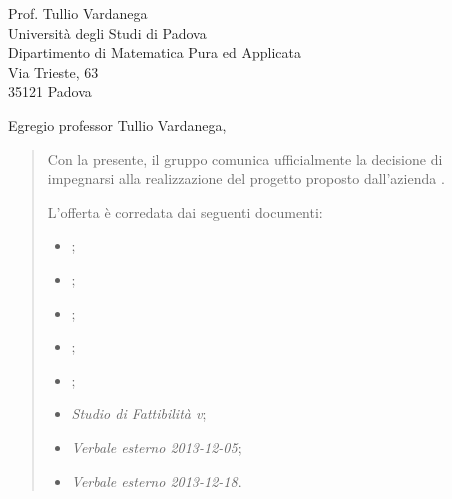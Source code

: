 \documentclass{letter}
\begin{document}

\date{Padova, 20 dicembre 2013}

\begin{letter}{
	Prof. Tullio Vardanega \\
	Università degli Studi di Padova \\
	Dipartimento di Matematica Pura ed Applicata \\
	Via Trieste, 63 \\
	35121 Padova
}


\signature{
\begin{center}
	\textit{
		\Responsabile{} \\
		Responsabile \GroupName{}
	}
	\texttt{[image: ../../modello/firme/GiacomoFornari.png]}
\end{center}
}


\opening{Egregio professor Tullio Vardanega,}

\begin{quotation}
	

	Con la presente, il gruppo \GroupName{} comunica ufficialmente la decisione di impegnarsi alla realizzazione del progetto \ProjectName{} proposto dall'azienda \Proponente{}.

	L'offerta è corredata dai seguenti documenti:

	\begin{itemize}

		\item \AnalisiDeiRequisiti{};
		\item \Glossario{};
		\item \NormeDiProgetto{};
		\item \PianoDiProgetto{};
		\item \PianoDiQualifica{};
		\item \emph{Studio di Fattibilità v\VersioneSF{}};
		\item \emph{Verbale esterno 2013-12-05};
		\item \emph{Verbale esterno 2013-12-18}.


\end{itemize}
\end{quotation}
\end{letter}
\end{document}
